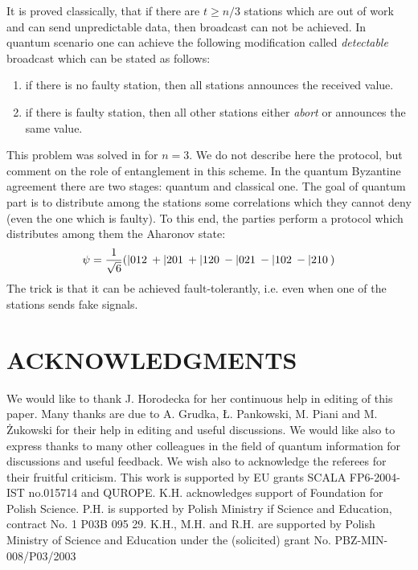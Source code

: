 \documentclass[rmp,12pt,preprint]{revtex4-2}
\begin{document}
It is proved classically, that if there are $t\geq n/3$ stations
which are out of work and can send unpredictable data, then
broadcast can not be achieved. In quantum scenario one can achieve
the following modification called {\it detectable} broadcast which
can be stated as follows:

\begin{enumerate}
\item if there is no faulty station, then all stations announces the
  received value.
\item if there is faulty station, then all other stations either {\it
    abort} or announces the same value.
\end{enumerate}

This problem was solved in \cite{Gisin01-byzantine} for $n=3$.
We do not describe here the protocol, but comment on the role of
entanglement in this scheme. In the quantum Byzantine agreement there
are two stages: quantum and classical one. The goal of quantum part
is to distribute among the stations some correlations which they
cannot deny (even the one which is faulty). To this end, the
parties perform a protocol which distributes among them
the Aharonov state:
\begin{equation}
\psi={1\over \sqrt6} (|012\>+|201\>+|120\> - |021\> -|102\>-|210\>)
\end{equation}
The trick is that it can be achieved fault-tolerantly, i.e.  even when
one of the stations sends fake signals.



\section*{ACKNOWLEDGMENTS}

We would like to thank J. Horodecka for her continuous help in editing of
this paper.  Many thanks are due to A. Grudka, \L{}. Pankowski,
M. Piani and M. \.Zukowski for their help in editing and
useful discussions.  We would like also to express thanks to many other
colleagues in the field of quantum information for discussions and useful feedback.
We wish also to acknowledge the referees for their fruitful
criticism. This work is supported by EU grants SCALA FP6-2004-IST no.015714 and
QUROPE. K.H. acknowledges support of Foundation for Polish Science. P.H.
is supported by Polish Ministry if Science and Education,
contract No. 1 P03B 095 29. K.H., M.H. and R.H. are supported
by Polish Ministry of Science and Education  under the (solicited) grant
No. PBZ-MIN-008/P03/2003



\end{document}
